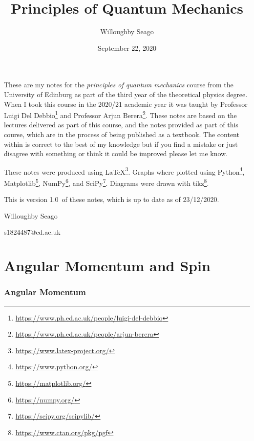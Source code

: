 \documentclass[a4paper]{article}
\author{Willoughby Seago}
\date{September 22, 2020}
\title{Principles of Quantum Mechanics}
\newcommand{\notesVersion}{1.0}
\newcommand{\notesDate}{23/12/2020}
\theoremstyle{definition}
\begin{document}
    \maketitle
    These are my notes for the \textit{principles of quantum mechanics} course from the University of Edinburg as part of the third year of the theoretical physics degree.
    When I took this course in the 2020/21 academic year it was taught by Professor Luigi Del Debbio\footnote{\url{https://www.ph.ed.ac.uk/people/luigi-del-debbio}} and Professor Arjun Berera\footnote{\url{https://www.ph.ed.ac.uk/people/arjun-berera}}.
    These notes are based on the lectures delivered as part of this course, and the notes provided as part of this course, which are in the process of being published as a textbook.
    The content within is correct to the best of my knowledge but if you find a mistake or just disagree with something or think it could be improved please let me know.
    
    These notes were produced using \LaTeX\footnote{\url{https://www.latex-project.org/}}.
    Graphs where plotted using Python\footnote{\url{https://www.python.org/}}, Matplotlib\footnote{\url{https://matplotlib.org/}}, NumPy\footnote{\url{https://numpy.org/}}, and SciPy\footnote{\url{https://scipy.org/scipylib/}}.
    Diagrams were drawn with tikz\footnote{\url{https://www.ctan.org/pkg/pgf}}.
    
    This is version \notesVersion~of these notes, which is up to date as of \notesDate.
    \begin{flushright}
        Willoughby Seago
        
        s1824487@ed.ac.uk
    \end{flushright}
    \clearpage
    \tableofcontents
    \listoffigures
    \listoftables
    \printglossary[type=\acronymtype, title=Acronyms, style=long]
    \clearpage
    \begingroup
    \let\clearpage\relax  %
    
    
    
    \endgroup
    
    
    \part{Angular Momentum and Spin}
    \section{Angular Momentum}
\end{document}
